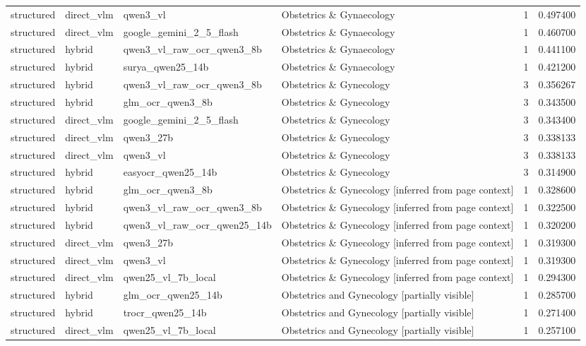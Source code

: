 \begin{tabular}{llllrr}
structured & direct\_vlm & qwen3\_vl & Obstetrics \& Gynaecology & 1 & 0.497400 \\
structured & direct\_vlm & google\_gemini\_2\_5\_flash & Obstetrics \& Gynaecology & 1 & 0.460700 \\
structured & hybrid & qwen3\_vl\_raw\_ocr\_qwen3\_8b & Obstetrics \& Gynaecology & 1 & 0.441100 \\
structured & hybrid & surya\_qwen25\_14b & Obstetrics \& Gynaecology & 1 & 0.421200 \\
structured & hybrid & qwen3\_vl\_raw\_ocr\_qwen3\_8b & Obstetrics \& Gynecology & 3 & 0.356267 \\
structured & hybrid & glm\_ocr\_qwen3\_8b & Obstetrics \& Gynecology & 3 & 0.343500 \\
structured & direct\_vlm & google\_gemini\_2\_5\_flash & Obstetrics \& Gynecology & 3 & 0.343400 \\
structured & direct\_vlm & qwen3\_27b & Obstetrics \& Gynecology & 3 & 0.338133 \\
structured & direct\_vlm & qwen3\_vl & Obstetrics \& Gynecology & 3 & 0.338133 \\
structured & hybrid & easyocr\_qwen25\_14b & Obstetrics \& Gynecology & 3 & 0.314900 \\
structured & hybrid & glm\_ocr\_qwen3\_8b & Obstetrics \& Gynecology [inferred from page context] & 1 & 0.328600 \\
structured & hybrid & qwen3\_vl\_raw\_ocr\_qwen3\_8b & Obstetrics \& Gynecology [inferred from page context] & 1 & 0.322500 \\
structured & hybrid & qwen3\_vl\_raw\_ocr\_qwen25\_14b & Obstetrics \& Gynecology [inferred from page context] & 1 & 0.320200 \\
structured & direct\_vlm & qwen3\_27b & Obstetrics \& Gynecology [inferred from page context] & 1 & 0.319300 \\
structured & direct\_vlm & qwen3\_vl & Obstetrics \& Gynecology [inferred from page context] & 1 & 0.319300 \\
structured & direct\_vlm & qwen25\_vl\_7b\_local & Obstetrics \& Gynecology [inferred from page context] & 1 & 0.294300 \\
structured & hybrid & glm\_ocr\_qwen25\_14b & Obstetrics and Gynecology [partially visible] & 1 & 0.285700 \\
structured & hybrid & trocr\_qwen25\_14b & Obstetrics and Gynecology [partially visible] & 1 & 0.271400 \\
structured & direct\_vlm & qwen25\_vl\_7b\_local & Obstetrics and Gynecology [partially visible] & 1 & 0.257100 \\

\end{tabular}
